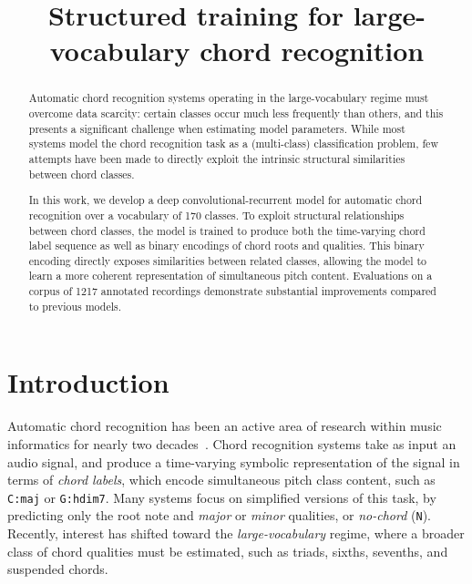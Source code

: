 \documentclass{article}
\title{Structured training for large-vocabulary chord recognition}
\begin{document}
%
\maketitle
%
\begin{abstract}
Automatic chord recognition systems operating in the large-vocabulary regime must overcome data scarcity: certain classes occur much less frequently than others, and this presents a significant challenge when estimating model parameters.
While most systems model the chord recognition task as a (multi-class) classification problem, few attempts have been made to directly exploit the intrinsic structural similarities between chord classes.

In this work, we develop a deep convolutional-recurrent model for automatic chord recognition over a vocabulary of 170 classes.
To exploit structural relationships between chord classes, the model is trained to produce both the time-varying chord label sequence as well as binary encodings of chord roots and qualities.
This binary encoding directly exposes similarities between related classes, allowing the model to learn a more coherent representation of simultaneous pitch content.
Evaluations on a corpus of 1217 annotated recordings demonstrate substantial improvements compared to previous models.
\end{abstract}
%
\section{Introduction}\label{sec:introduction}




Automatic chord recognition has been an active area of research within music informatics for nearly two decades~\cite{fujishima1999realtime}.
Chord recognition systems take as input an audio signal, and produce a time-varying symbolic representation of the signal in terms of \emph{chord labels}, which encode simultaneous pitch class content, such as \texttt{C:maj} or \texttt{G:hdim7}.
Many systems focus on simplified versions of this task, by predicting only the root note and \emph{major} or \emph{minor} qualities, or \emph{no-chord} (\texttt{N}).
Recently, interest has shifted toward the \emph{large-vocabulary} regime, where a broader class of chord qualities must be estimated, such as triads, sixths, sevenths, and suspended chords.
\end{document}
